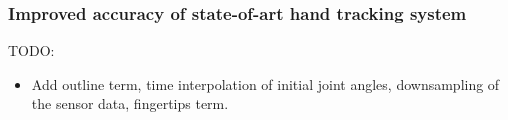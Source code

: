 \documentclass[tog]{acmsiggraph}
\begin{document}
\subsubsection*{Improved accuracy of state-of-art hand tracking system}

TODO: 

\begin{itemize}
\item Add outline term, time interpolation of initial joint angles, downsampling of the sensor data, fingertips term.
\end{itemize}




%
%
 


\appendix

\end{document}
